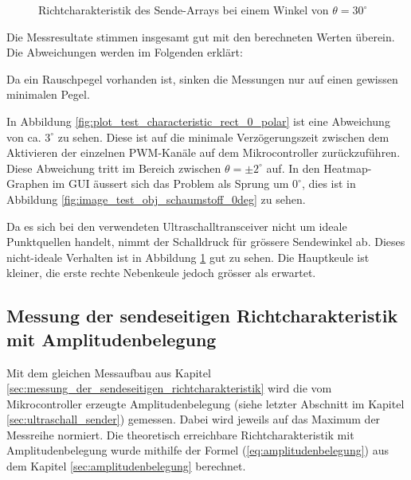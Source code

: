 \begin{figure}[htb]
\begin{minipage}{0.5\textwidth}
\caption{Richtcharakteristik des Sende-Arrays bei einem Winkel von $\theta = 30^{\circ}$} %
\label{fig:plot_test_characteristic_rect_30_polar}
%
\end{minipage}
\end{figure}

Die Messresultate stimmen insgesamt gut mit den berechneten Werten überein. Die Abweichungen werden im Folgenden erklärt:

Da ein Rauschpegel vorhanden ist, sinken die Messungen nur auf einen gewissen minimalen Pegel.

In Abbildung \ref{fig:plot_test_characteristic_rect_0_polar} ist eine Abweichung von ca. $3^{\circ}$ zu sehen. Diese ist auf die minimale Verzögerungszeit zwischen dem Aktivieren der einzelnen PWM-Kanäle auf dem Mikrocontroller zurückzuführen. Diese Abweichung tritt im Bereich zwischen $\theta = \pm 2^{\circ}$ auf. In den Heatmap-Graphen im GUI äussert sich das Problem als Sprung um $0^{\circ}$, dies ist in Abbildung \ref{fig:image_test_obj_schaumstoff_0deg} zu sehen.

Da es sich bei den verwendeten Ultraschalltransceiver nicht um ideale Punktquellen handelt, nimmt der Schalldruck für grössere Sendewinkel ab. Dieses nicht-ideale Verhalten ist in Abbildung \ref{fig:plot_test_characteristic_rect_30_polar} gut zu sehen. Die Hauptkeule ist kleiner, die erste rechte Nebenkeule jedoch grösser als erwartet.

\subsection{Messung der sendeseitigen Richtcharakteristik mit Amplitudenbelegung}\label{sec:messung_der_sendeseitigen_richtcharakteristik_mit_amplitudenbelegung}
Mit dem gleichen Messaufbau aus Kapitel \ref{sec:messung_der_sendeseitigen_richtcharakteristik} wird die vom Mikrocontroller erzeugte Amplitudenbelegung (siehe letzter Abschnitt im Kapitel \ref{sec:ultraschall_sender}) gemessen. Dabei wird jeweils auf das Maximum der Messreihe normiert. Die theoretisch erreichbare Richtcharakteristik mit Amplitudenbelegung wurde mithilfe der Formel (\ref{eq:amplitudenbelegung}) aus dem Kapitel \ref{sec:amplitudenbelegung} berechnet.

